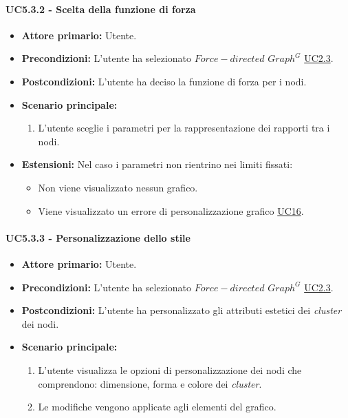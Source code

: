 \paragraph{UC5.3.2 - Scelta della funzione di forza}
\label{sec:UC5.3.2}
    \begin{itemize}
        \item \textbf{Attore primario:} Utente.
        \item \textbf{Precondizioni:} L'utente ha selezionato $Force-directed$ $Graph^{G}$ \hyperref[sec:UC2.3]{UC2.3}.
	    \item \textbf{Postcondizioni:} L'utente ha deciso la funzione di forza per i nodi.
	    \item \textbf{Scenario principale:} 
	    \begin{enumerate}
	    		\item L'utente sceglie i parametri per la rappresentazione dei rapporti tra i nodi.
		\end{enumerate}
	    \item \textbf{Estensioni:} Nel caso i parametri non rientrino nei limiti fissati:
              \begin{itemize}
                  \item Non viene visualizzato nessun grafico.
                  \item Viene visualizzato un errore di personalizzazione grafico \hyperref[sec:UC16 - Errore di personalizzazione]{UC16}.
              \end{itemize}
    \end{itemize}
\paragraph{UC5.3.3 - Personalizzazione dello stile}
\label{sec:UC5.3.3}
    \begin{itemize}
        \item \textbf{Attore primario:} Utente.
        \item \textbf{Precondizioni:} L'utente ha selezionato $Force-directed$ $Graph^{G}$ \hyperref[sec:UC2.3]{UC2.3}.
	    \item \textbf{Postcondizioni:} L'utente ha personalizzato gli attributi estetici dei \textit{cluster} dei nodi.
	    \item \textbf{Scenario principale:} 
	    \begin{enumerate}
                \item L'utente visualizza le opzioni di personalizzazione dei nodi che comprendono: dimensione, forma e colore dei \textit{cluster}.
	    		\item Le modifiche vengono applicate agli elementi del grafico.
		\end{enumerate}
    \end{itemize}

